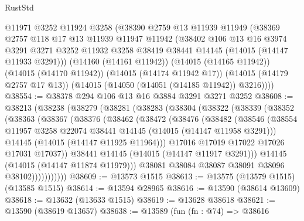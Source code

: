 \begin{lexlean}{RustStd}
\begin{coremodule}
    @11971
    @3252
    @11924
    @3258
    (@38390
      @2759
      @13
      @11939
      @11949
      (@38369
        @2757
        @118
        @17
        @13
        @11939
        @11947
        @11942
        (@38402
          @106
          @13
          @16
          @3974
          @3291
          @3271
          @3252
          @11932
          @3258
          @38419
          @38441
          @14145
          (@14015 (@14147 @11933 @3291)))
        (@14160 (@14161 @11942))
        (@14015 (@14165 @11942))
        (@14015 (@14170 @11942))
        (@14015 (@14174 @11942 @17))
        (@14015 (@14179 @2757 @17 @13))
        (@14015 (@14050 (@14051 (@14185 @11942)) @3216))))
@38554 := @38378 @294 @106 @13 @16 @3884 @3291 @3271 @3252
@38608 := @38213
    (@38238
      (@38279
        (@38281
          (@38283
            (@38304
              (@38322
                (@38339
                  (@38352
                    (@38363
                      (@38367
                        (@38376
                          (@38462
                            (@38472
                              (@38476
                                (@38482
                                  (@38546
                                    (@38554
                                      @11957
                                      @3258
                                      @22074
                                      @38441
                                      @14145
                                      (@14015 (@14147 @11958 @3291)))
                                    @14145
                                    (@14015 (@14147 @11925 @11964)))
                                  @17016
                                  @17019
                                  @17022
                                  @17026
                                  @17031
                                  @17037))
                              @38441
                              @14145
                              (@14015 (@14147 @11917 @3291)))
                            @14145
                            (@14015 (@14147 @11874 @11979)))
                          @38081
                          @38084
                          @38087
                          @38091
                          @38096
                          @38102)))))))))))
@38609 := @13573 @1515
@38613 := @13575 (@13579 @1515) (@13585 @1515)
@38614 := @13594 @28965
@38616 := @13590 (@38614 @13609)
@38618 := @13632 (@13633 @1515)
@38619 := @13628 @38618
@38621 := @13590 (@38619 @13657)
@38638 := @13589
    (fun (fn : @74) =>
    @38616

\end{coremodule}
\end{lexlean}
